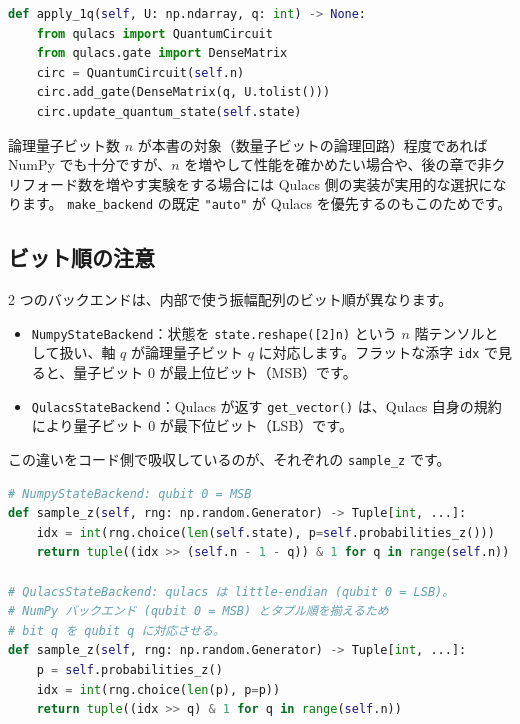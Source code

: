 \begin{lstlisting}[language=Python, caption={QulacsStateBackend の 1 量子ビットゲート適用（src/ftqc/hybrid\_ftqc\_runtime.py）}]
def apply_1q(self, U: np.ndarray, q: int) -> None:
    from qulacs import QuantumCircuit
    from qulacs.gate import DenseMatrix
    circ = QuantumCircuit(self.n)
    circ.add_gate(DenseMatrix(q, U.tolist()))
    circ.update_quantum_state(self.state)
\end{lstlisting}

論理量子ビット数 $n$ が本書の対象（数量子ビットの論理回路）程度であれば NumPy でも十分ですが、$n$ を増やして性能を確かめたい場合や、後の章で非クリフォード数を増やす実験をする場合には Qulacs 側の実装が実用的な選択になります。
\texttt{make\_backend} の既定 \texttt{"auto"} が Qulacs を優先するのもこのためです。

\subsection{ビット順の注意}

2 つのバックエンドは、内部で使う振幅配列のビット順が異なります。

\begin{itemize}
  \item \texttt{NumpyStateBackend}：状態を \texttt{state.reshape([2]\*n)} という $n$ 階テンソルとして扱い、軸 $q$ が論理量子ビット $q$ に対応します。フラットな添字 \texttt{idx} で見ると、量子ビット $0$ が最上位ビット（MSB）です。
  \item \texttt{QulacsStateBackend}：Qulacs が返す \texttt{get\_vector()} は、Qulacs 自身の規約により量子ビット $0$ が最下位ビット（LSB）です。
\end{itemize}

この違いをコード側で吸収しているのが、それぞれの \texttt{sample\_z} です。

\begin{lstlisting}[language=Python, caption={ビット順を揃える sample\_z（src/ftqc/hybrid\_ftqc\_runtime.py）}]
# NumpyStateBackend: qubit 0 = MSB
def sample_z(self, rng: np.random.Generator) -> Tuple[int, ...]:
    idx = int(rng.choice(len(self.state), p=self.probabilities_z()))
    return tuple((idx >> (self.n - 1 - q)) & 1 for q in range(self.n))

# QulacsStateBackend: qulacs は little-endian (qubit 0 = LSB)。
# NumPy バックエンド (qubit 0 = MSB) とタプル順を揃えるため
# bit q を qubit q に対応させる。
def sample_z(self, rng: np.random.Generator) -> Tuple[int, ...]:
    p = self.probabilities_z()
    idx = int(rng.choice(len(p), p=p))
    return tuple((idx >> q) & 1 for q in range(self.n))
\end{lstlisting}

